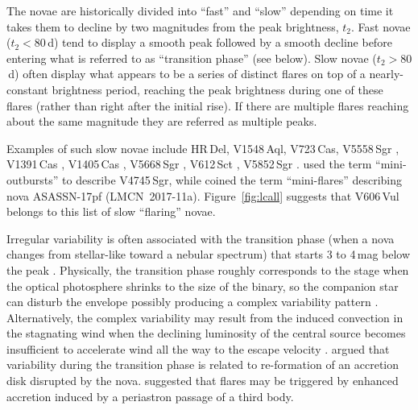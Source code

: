 \documentclass[twocolumn]{aastex631}
\newcommand{\nova}{V606\,Vul}
\begin{document}
The novae are historically divided into ``fast'' and ``slow'' depending on time
it takes them to decline by two magnitudes from the peak brightness, $t_2$.
Fast novae ($t_2<80$\,d) tend to display a smooth peak followed by a smooth decline 
before entering what is referred to as ``transition phase'' (see below).
Slow novae ($t_2>80$\,d) often display what appears to be a series of distinct flares on
top of a nearly-constant brightness period, reaching the peak brightness during one of these flares
(rather than right after the initial rise). If there are multiple flares
reaching about the same magnitude they are referred as multiple peaks.

Examples of such slow novae include 
HR\,Del, V1548\,Aql, V723\,Cas, V5558\,Sgr \citep{2018arXiv180707947P},
V1391\,Cas \citep{2021OEJV..220...37D},
V1405\,Cas \citep{2023arXiv230204656V},
V5668\,Sgr \citep[][]{2022MNRAS.511.1591T},
V612\,Sct \citep{2020A&A...635A.115M},
V5852\,Sgr \citep{2016MNRAS.461.1529A}.
\cite{2005A&A...429..599C} used the term ``mini-outbursts'' to describe
V4745\,Sgr, while \cite{2019arXiv190309232A} coined the term ``mini-flares''
describing nova ASASSN-17pf (LMCN~2017-11a).
Figure~\ref{fig:lcall} suggests that \nova{} belongs to this list of slow
``flaring'' novae.

Irregular variability is often associated with the 
transition phase (when a nova changes from stellar-like toward a nebular spectrum) that starts
3 to 4\,mag below the peak \citep{1949PASP...61...74M}.
Physically, the transition phase roughly corresponds to the stage when the optical photosphere
shrinks to the size of the binary, so the companion star can
disturb the envelope possibly producing a complex variability pattern
\citep[see \S~3.7 of][]{2001MNRAS.326..126S}. 
Alternatively, the complex variability may result from the induced convection 
in the stagnating wind when the declining luminosity of the central source
becomes insufficient to accelerate wind all the way to the escape velocity
\citep{1997ASPC..120..121O,2001MNRAS.326..126S}. 
\cite{2002AIPC..637..279R,2002ASPC..261..655R,2012A&A...544A.149M} argued that variability
during the transition phase is related to re-formation of an accretion disk disrupted by the nova.
\cite{2003BaltA..12..610C} suggested that flares may be triggered by enhanced
accretion induced by a periastron passage of a third body.
\end{document}

